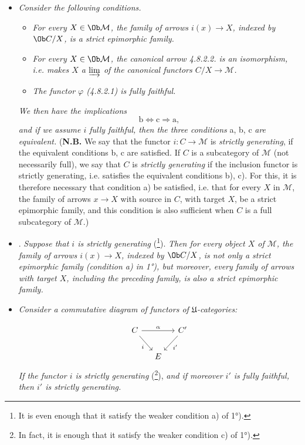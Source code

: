\begin{itemize}[label={}]
\item[\textit{1°)}] \textit{Consider the following conditions.}
\begin{itemize}[label={}]
\item[\circled{a}] \textit{For every $X \in \Ob \mathcal{M}$, the family of arrows $i(x) \longrightarrow X$, indexed by $\Ob C/X$, is a strict epimorphic family.}

\item[\circled{b}] \textit{For every $X \in \Ob \mathcal{M}$, the canonical arrow 4.8.2.2. is an isomorphism, i.e. makes $X$ a $\varinjlim$ of the canonical functors $C/X \longrightarrow \mathcal{M}$.}
\item[\circled{c}] \textit{The functor $\varphi$ (4.8.2.1) is fully faithful.}
\end{itemize}
\textit{We then have the implications}
\[ \mathrm{b} \Longleftrightarrow \mathrm{c} \Longrightarrow \mathrm{a} , \]
\textit{and if we assume $i$ fully faithful, then the three conditions} a, b, c \textit{are equivalent.} (\textbf{N.B.} We say that the functor $i : C \longrightarrow \mathcal{M}$ is \textit{strictly generating}, if the equivalent conditions b, c are satisfied. If $C$ is a subcategory of $\mathcal{M}$ (not
necessarily full), we say that $C$ is \textit{strictly generating} if the inclusion functor is strictly generating, i.e. satisfies the equivalent conditions b), c). For this, it is therefore necessary that condition a) be satisfied, i.e. that for every $X$ in $\mathcal{M}$, the family of arrows $x \longrightarrow X$ with source in $C$, with target $X$, be a strict epimorphic family, and this condition is also sufficient when $C$ is a full subcategory of $\mathcal{M}$.)
\item[\textit{2°)}] . \textit{Suppose that $i$ is strictly generating} (\footnote[81]{It is even enough that it satisfy the weaker condition a) of 1°).}). \textit{Then for every object $X$ of $\mathcal{M}$, the family of arrows $i(x) \longrightarrow X$, indexed by $\Ob C/X$, is not only a strict epimorphic family (condition a) in 1°), but moreover, every family of arrows with target $X$, including the preceding family, is also a strict epimorphic family.}
\item[\textit{3°)}] \textit{Consider a commutative diagram of functors of $\mathfrak{U}$-categories:}

\[ \begin{tikzcd}[column sep=small]
C \arrow[rr, "\alpha"] \arrow[dr, "i"'] & & C' \arrow[dl, "i'"] \\
& E &
\end{tikzcd} \]
\textit{If the functor $i$ is strictly generating} (\footnote[82]{In fact, it is enough that it satisfy the weaker condition c) of 1°).}), \textit{and if moreover $i'$ is fully faithful, then $i'$ is strictly generating.}
\end{itemize}

